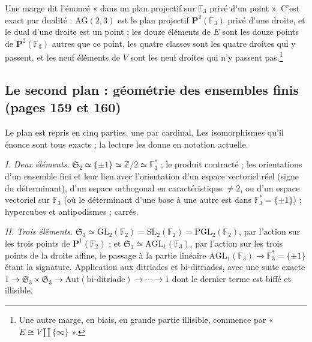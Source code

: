 \documentclass[11pt,a4paper]{article}
\begin{document}
Une marge dit l'énoncé « dans un plan projectif sur $\mathbb{F}_3$ privé d'un
point ». C'est exact par dualité : $\mathrm{AG}(2,3)$ est le plan projectif
$\mathbf{P}^2(\mathbb{F}_3)$ privé d'une droite, et le dual d'une droite est
un point ; les douze éléments de $E$ sont les douze points de
$\mathbf{P}^2(\mathbb{F}_3)$ autres que ce point, les quatre classes sont les
quatre droites qui y passent, et les neuf éléments de $V$ sont les neuf droites
qui n'y passent pas.\footnote{Une autre marge, en biais, en grande partie
illisible, commence par « $E \cong V \amalg \{\infty\}$ ».}

\subsection*{Le second plan : géométrie des ensembles finis (pages 159 et 160)}

Le plan est repris en cinq parties, une par cardinal. Les isomorphismes qu'il
énonce sont tous exacts ; la lecture les donne en notation actuelle.

\emph{I. Deux éléments.} $\mathfrak{S}_2 \simeq \{\pm 1\} \simeq
\mathbb{Z}/2 \simeq \mathbb{F}_3^{*}$ ; le produit contracté ; les orientations
d'un ensemble fini et leur lien avec l'orientation d'un espace vectoriel réel
(signe du déterminant), d'un espace orthogonal en caractéristique $\neq 2$, ou
d'un espace vectoriel sur $\mathbb{F}_3$ (où le déterminant d'une base à une
autre est dans $\mathbb{F}_3^{*} = \{\pm1\}$) ; hypercubes et antipodismes ;
carrés.

\emph{II. Trois éléments.} $\mathfrak{S}_3 \simeq \mathrm{GL}_2(\mathbb{F}_2)
= \mathrm{SL}_2(\mathbb{F}_2) = \mathrm{PGL}_2(\mathbb{F}_2)$, par l'action sur
les trois points de $\mathbf{P}^1(\mathbb{F}_2)$ ; et $\mathfrak{S}_3 \simeq
\mathrm{AGL}_1(\mathbb{F}_3)$, par l'action sur les trois points de la droite
affine, le passage à la partie linéaire $\mathrm{AGL}_1(\mathbb{F}_3) \to
\mathbb{F}_3^{*} = \{\pm 1\}$ étant la signature. Application aux ditriades et
bi-ditriades, avec une suite exacte
$1 \to \mathfrak{S}_3 \times \mathfrak{S}_3 \to \mathrm{Aut}(\text{bi-ditriade})
\to \cdots \to 1$ dont le dernier terme est biffé et illisible.
\end{document}

